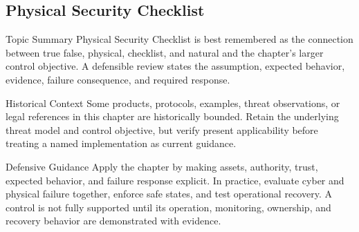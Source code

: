 \documentclass[11pt,letterpaper]{article}
\begin{document}
\subsection*{Physical Security Checklist}
\begin{CornellNotesTable}
\end{CornellNotesTable}
\begin{CornellSummaryBox}{Topic Summary}
Physical Security Checklist is best remembered as the connection between true false, physical, checklist, and natural and the chapter's larger control objective. A defensible review states the assumption, expected behavior, evidence, failure consequence, and required response.
\end{CornellSummaryBox}
\begin{CornellWarningBox}{Historical Context}
Some products, protocols, examples, threat observations, or legal references in this chapter are historically bounded. Retain the underlying threat model and control objective, but verify present applicability before treating a named implementation as current guidance.
\end{CornellWarningBox}
\begin{CornellOverviewBox}{Defensive Guidance}
Apply the chapter by making assets, authority, trust, expected behavior, and failure response explicit. In practice, evaluate cyber and physical failure together, enforce safe states, and test operational recovery. A control is not fully supported until its operation, monitoring, ownership, and recovery behavior are demonstrated with evidence.
\end{CornellOverviewBox}
\end{document}
